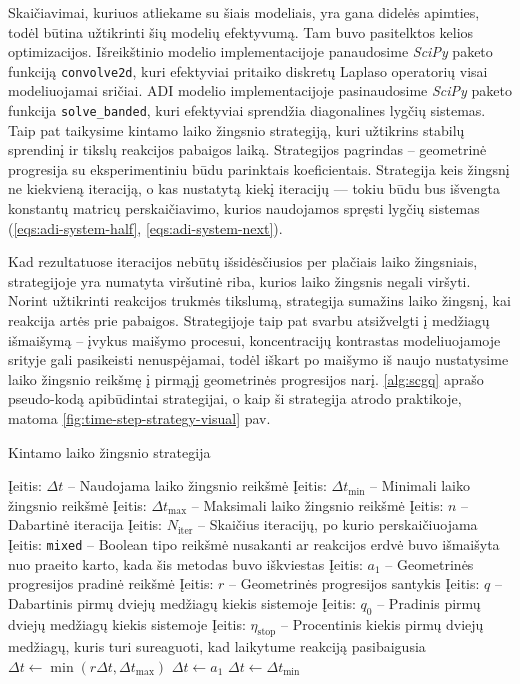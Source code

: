 Skaičiavimai, kuriuos atliekame su šiais modeliais, yra gana didelės apimties, todėl būtina užtikrinti šių modelių efektyvumą. Tam buvo pasitelktos kelios optimizacijos. Išreikštinio modelio implementacijoje panaudosime \textit{SciPy} paketo funkciją \texttt{convolve2d}, kuri efektyviai pritaiko diskretų Laplaso operatorių visai modeliuojamai sričiai. ADI modelio implementacijoje pasinaudosime \textit{SciPy} paketo funkcija \texttt{solve\_banded}, kuri efektyviai sprendžia diagonalines lygčių sistemas. Taip pat taikysime kintamo laiko žingsnio strategiją, kuri užtikrins stabilų sprendinį ir tikslų reakcijos pabaigos laiką. Strategijos pagrindas -- geometrinė progresija su eksperimentiniu būdu parinktais koeficientais. Strategija keis žingsnį ne kiekvieną iteraciją, o kas nustatytą kiekį iteracijų — tokiu būdu bus išvengta konstantų matricų perskaičiavimo, kurios naudojamos spręsti lygčių sistemas (\ref{eqs:adi-system-half}, \ref{eqs:adi-system-next}). 

Kad rezultatuose iteracijos nebūtų išsidėsčiusios per plačiais laiko žingsniais, strategijoje yra numatyta viršutinė riba, kurios laiko žingsnis negali viršyti. Norint užtikrinti reakcijos trukmės tikslumą, strategija sumažins laiko žingsnį, kai reakcija artės prie pabaigos. Strategijoje taip pat svarbu atsižvelgti į medžiagų išmaišymą -- įvykus maišymo procesui, koncentracijų kontrastas modeliuojamoje srityje gali pasikeisti nenuspėjamai, todėl iškart po maišymo iš naujo nustatysime laiko žingsnio reikšmę į pirmąjį geometrinės progresijos narį. \ref{alg:scgq} aprašo pseudo-kodą apibūdintai strategijai, o kaip ši strategija atrodo praktikoje, matoma \ref{fig:time-step-strategy-visual} pav.


\begin{algorithm}[h]
  \caption{Kintamo laiko žingsnio strategija}\label{alg:scgq}
  \begin{algorithmic}[1]
    \STATE Įeitis: $\Delta t$ -- Naudojama laiko žingsnio reikšmė
    \STATE Įeitis: $\Delta t_\text{min}$ -- Minimali laiko žingsnio reikšmė
    \STATE Įeitis: $\Delta t_\text{max}$ -- Maksimali laiko žingsnio reikšmė
    \STATE Įeitis: $n$ -- Dabartinė iteracija
    \STATE Įeitis: $N_{\text{iter}}$ -- Skaičius iteracijų, po kurio perskaičiuojama
    \STATE Įeitis: \texttt{mixed} -- Boolean tipo reikšmė nusakanti ar reakcijos erdvė buvo išmaišyta nuo praeito karto, kada šis metodas buvo iškviestas
    \STATE Įeitis: $a_1$ -- Geometrinės progresijos pradinė reikšmė
    \STATE Įeitis: $r$ -- Geometrinės progresijos santykis
    \STATE Įeitis: $q$ -- Dabartinis pirmų dviejų medžiagų kiekis sistemoje
    \STATE Įeitis: $q_0$ -- Pradinis pirmų dviejų medžiagų kiekis sistemoje
    \STATE Įeitis: $\eta_\text{stop}$ -- Procentinis kiekis pirmų dviejų medžiagų, kuris turi sureaguoti, kad laikytume reakciją pasibaigusia
      \STATE $\Delta t \gets \min(r\Delta t, \Delta t_\text{max})$
    \ENDIF
      \STATE $\Delta t \gets a_1$
    \ENDIF
      \STATE $\Delta t \gets \Delta t_\text{min}$
    \ENDIF
  \end{algorithmic}
\end{algorithm}

